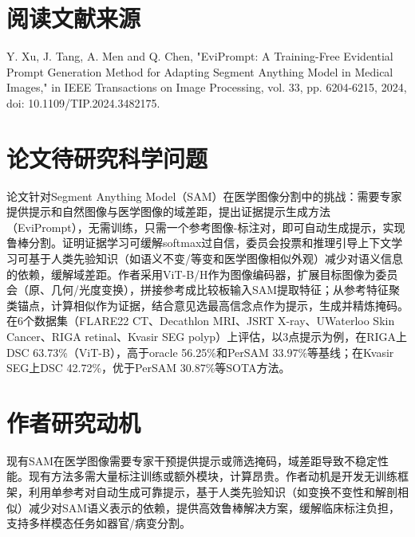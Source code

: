 \documentclass[12pt,a4paper]{article}
\begin{document}

	\section{阅读文献来源}
	\noindent Y. Xu, J. Tang, A. Men and Q. Chen, "EviPrompt: A Training-Free Evidential Prompt Generation Method for Adapting Segment Anything Model in Medical Images," in IEEE Transactions on Image Processing, vol. 33, pp. 6204-6215, 2024, doi: 10.1109/TIP.2024.3482175.
	
	\begin{figure}[H]
		\centering
	\end{figure}
	
	\section{论文待研究科学问题}
	论文针对Segment Anything Model（SAM）在医学图像分割中的挑战：需要专家提供提示和自然图像与医学图像的域差距，提出证据提示生成方法（EviPrompt），无需训练，只需一个参考图像-标注对，即可自动生成提示，实现鲁棒分割。证明证据学习可缓解softmax过自信，委员会投票和推理引导上下文学习可基于人类先验知识（如语义不变/等变和医学图像相似外观）减少对语义信息的依赖，缓解域差距。作者采用ViT-B/H作为图像编码器，扩展目标图像为委员会（原、几何/光度变换），拼接参考成比较板输入SAM提取特征；从参考特征聚类锚点，计算相似作为证据，结合意见选最高信念点作为提示，生成并精炼掩码。在6个数据集（FLARE22 CT、Decathlon MRI、JSRT X-ray、UWaterloo Skin Cancer、RIGA retinal、Kvasir SEG polyp）上评估，以3点提示为例，在RIGA上DSC 63.73\%（ViT-B），高于oracle 56.25\%和PerSAM 33.97\%等基线；在Kvasir SEG上DSC 42.72\%，优于PerSAM 30.87\%等SOTA方法。
	\section{作者研究动机}
	现有SAM在医学图像需要专家干预提供提示或筛选掩码，域差距导致不稳定性能。现有方法多需大量标注训练或额外模块，计算昂贵。作者动机是开发无训练框架，利用单参考对自动生成可靠提示，基于人类先验知识（如变换不变性和解剖相似）减少对SAM语义表示的依赖，提供高效鲁棒解决方案，缓解临床标注负担，支持多样模态任务如器官/病变分割。
\end{document}
